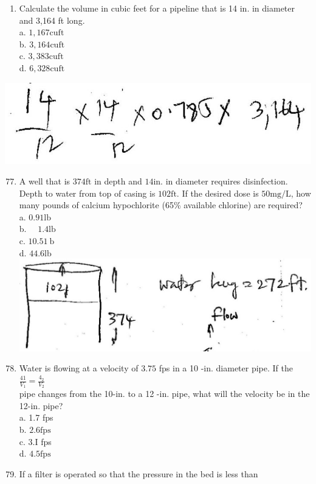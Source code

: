 \documentclass[10pt]{article}
\begin{document}
\begin{enumerate}
  \item Calculate the volume in cubic feet for a pipeline that is 14 in. in diameter and 3,164 ft long.\\
a. $1,167 \mathrm{cu} \mathrm{ft}$\\
b. $3,164 \mathrm{cu} \mathrm{ft}$\\
c. $3,383 \mathrm{cu} \mathrm{ft}$\\
d. $6,328 \mathrm{cu} \mathrm{ft}$

\end{enumerate}

\includegraphics[max width=\textwidth]{2022_11_11_ca6a6c1a0324ee23e523g-64}

\begin{enumerate}
  \setcounter{enumi}{76}
  \item A well that is $374 \mathrm{ft}$ in depth and $14 \mathrm{in}$. in diameter requires disinfection. Depth to water from top of casing is $102 \mathrm{ft}$. If the desired dose is $50 \mathrm{mg} / \mathrm{L}$, how many pounds of calcium hypochlorite (65\% available chlorine) are required?\\
a. $0.91 \mathrm{lb}$\\
b. $\quad 1.4 \mathrm{lb}$\\
c. $10.51 \mathrm{~b}$\\
d. $44.6 \mathrm{lb}$\\

\includegraphics[max width=\textwidth]{2022_11_11_ca6a6c1a0324ee23e523g-65}

  \item Water is flowing at a velocity of $3.75$ fps in a 10 -in. diameter pipe. If the $\frac{41}{V_{1}}=\frac{4_{2}}{V_{2}}$\\
pipe changes from the 10-in. to a 12 -in. pipe, what will the velocity be in the 12-in. pipe?\\
a. 1.7 fps\\
b. $2.6 \mathrm{fps}$\\
c. 3.I fps\\
d. $4.5 \mathrm{fps}$

  \item If a filter is operated so that the pressure in the bed is less than

\end{enumerate}
\end{document}
